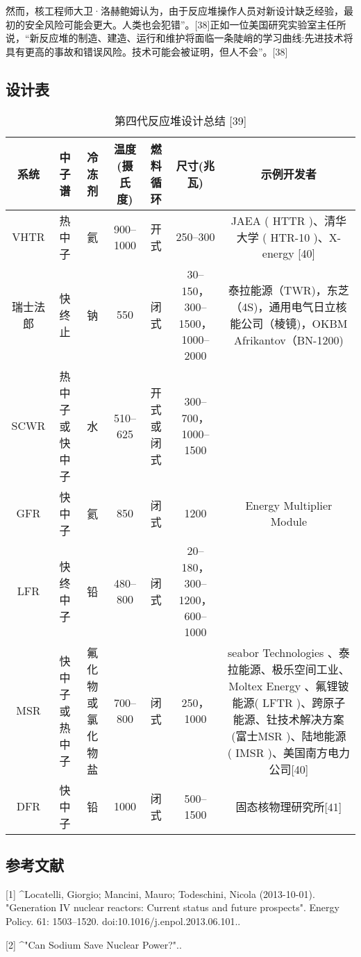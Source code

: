 然而，核工程师大卫·洛赫鲍姆认为，由于反应堆操作人员对新设计缺乏经验，最初的安全风险可能会更大。人类也会犯错”。[38]正如一位美国研究实验室主任所说，“新反应堆的制造、建造、运行和维护将面临一条陡峭的学习曲线:先进技术将具有更高的事故和错误风险。技术可能会被证明，但人不会”。[38]

\subsection{设计表}
\begin{table}[ht]
\centering
\caption{第四代反应堆设计总结 [39]}\label{FYD}
\begin{tabular}{|c|c|c|c|c|c|c}
\hline
\textbf{系统} & \textbf{中子谱} & \textbf{冷冻剂} & \textbf{温度(摄氏度)} & \textbf{燃料循环} & \textbf{尺寸(兆瓦)} & \textbf{示例开发者}\\
\hline
VHTR & 热中子 & 氦 & 900–1000 & 开式 & 250–300 & JAEA ( HTTR )、清华大学 ( HTR-10 )、X-energy [40]\\
\hline
瑞士法郎 & 快终止 & 钠 & 550 & 闭式 & 30–150，300–1500，1000–2000 & 泰拉能源（TWR)，东芝（4S)，通用电气日立核能公司（棱镜)，OKBM Afrikantov（BN-1200)\\
\hline
SCWR & 热中子或快中子 & 水 & 510–625 & 开式或闭式 & 300–700，1000–1500 & \\
\hline
GFR & 快中子 & 氦 & 850 & 闭式 & 1200 & Energy Multiplier Module\\
\hline
LFR & 快终中子 & 铅 & 480–800 & 闭式 & 20–180，300–1200，600–1000 & \\
\hline
MSR & 快中子或热中子 & 氟化物或氯化物盐 & 700–800 & 闭式 & 250，1000 & seabor Technologies 、泰拉能源、极乐空间工业、 Moltex Energy 、氟锂铍能源( LFTR )、跨原子能源、钍技术解决方案(富士MSR )、陆地能源 ( IMSR )、美国南方电力公司[40]\\
\hline
DFR & 快中子 & 铅 & 1000 & 闭式 & 500–1500 & 固态核物理研究所[41]\\
\hline
\end{tabular}
\end{table}

\subsection{参考文献}
[1]
^Locatelli, Giorgio; Mancini, Mauro; Todeschini, Nicola (2013-10-01). "Generation IV nuclear reactors: Current status and future prospects". Energy Policy. 61: 1503–1520. doi:10.1016/j.enpol.2013.06.101..

[2]
^"Can Sodium Save Nuclear Power?"..

